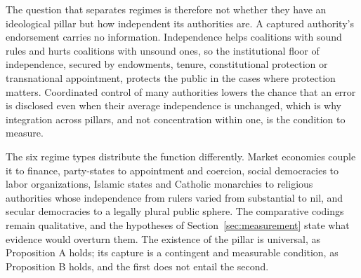 \documentclass[11pt,letterpaper]{article}
\theoremstyle{definition}
\theoremstyle{remark}
\begin{document}
The question that separates regimes is therefore not whether they have an ideological pillar but how independent its authorities are. A captured authority's endorsement carries no information. Independence helps coalitions with sound rules and hurts coalitions with unsound ones, so the institutional floor of independence, secured by endowments, tenure, constitutional protection or transnational appointment, protects the public in the cases where protection matters. Coordinated control of many authorities lowers the chance that an error is disclosed even when their average independence is unchanged, which is why integration across pillars, and not concentration within one, is the condition to measure.

The six regime types distribute the function differently. Market economies couple it to finance, party-states to appointment and coercion, social democracies to labor organizations, Islamic states and Catholic monarchies to religious authorities whose independence from rulers varied from substantial to nil, and secular democracies to a legally plural public sphere. The comparative codings remain qualitative, and the hypotheses of Section~\ref{sec:measurement} state what evidence would overturn them. The existence of the pillar is universal, as Proposition A holds; its capture is a contingent and measurable condition, as Proposition B holds, and the first does not entail the second.
\end{document}
